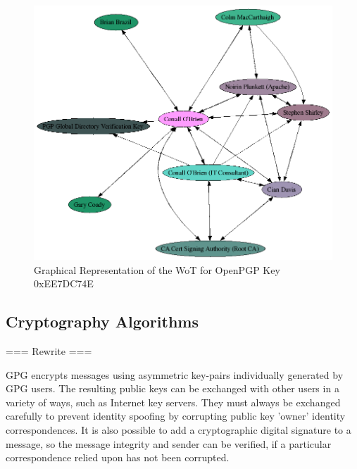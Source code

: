 \begin{figure}[p]

\label{fig:wot}

\begin{center}

\includegraphics[bb= 0 0 868 739,scale=0.5]{include/EE7DC74E.png}

\end{center}

\caption{Graphical Representation of the WoT for OpenPGP Key 0xEE7DC74E}

\end{figure}

\pagebreak

\subsection{Cryptography Algorithms}

=== Rewrite ===


GPG encrypts messages using asymmetric key-pairs individually generated
by GPG users. The resulting public keys can be exchanged with other
users in a variety of ways, such as Internet key servers. They must
always be exchanged carefully to prevent identity spoofing by
corrupting public key 'owner' identity correspondences. It is
also possible to add a cryptographic digital signature to a message, so
the message integrity and sender can be verified, if a particular
correspondence relied upon has not been corrupted.

